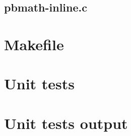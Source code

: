 \subsection{pbmath-inline.c}

\begin{scriptsize}
\begin{ttfamily}

\end{ttfamily}
\end{scriptsize}

\section{Makefile}

\begin{scriptsize}
\begin{ttfamily}

\end{ttfamily}
\end{scriptsize}

\section{Unit tests}

\begin{scriptsize}
\begin{ttfamily}

\end{ttfamily}
\end{scriptsize}

\section{Unit tests output}

\begin{scriptsize}
\begin{ttfamily}

\end{ttfamily}
\end{scriptsize}


